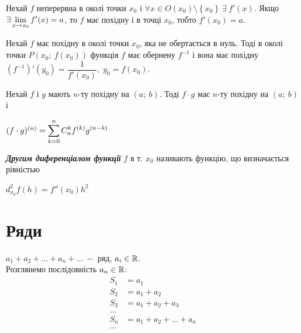 \begin{theorem}
        Нехай $f$ неперервна в околі точки $x_0$ і  $\forall x \in O(x_0)\setminus \left \{ x_0  \right \} \ \exists \ f'(x)$. Якщо $\exists \displaystyle\lim\limits_{x \to x_0} f'(x) = a$, то $f$ має похідну і в точці $x_0$, тобто $f'(x_0) = a$.
\end{theorem}

\begin{theorem}
        Нехай $f$ має похідну в околі точки $x_0$, яка не обертається в нуль. Тоді в околі точки $P(x_0; \:  f(x_0))$ функція $f$ має обернену $f^{-1}$ і вона має похідну $(f^{-1})'(y_0) = \dfrac{1}{f'(x_0)}, \; y_0 = f(x_0)$.
\end{theorem}

\begin{theorem}
        Нехай $f$ і $g$ мають $n$-ту похідну на $(a; \: b)$. Тоді $f\cdot g$ має $n$-ту похідну на $(a; \: b)$ і  \centerline{$(f \cdot g)^{(n)} = \displaystyle\sum\limits_{k=0}^n C_n^{k}  f^{(k)}  g^{(n - k)}$}
\end{theorem}

\begin{definition}
        \textcolor{NavyBlue}{\textbf{\textit{ Другим диференціалом функції}}} $f$ в т. $x_0$ називають функцію, що визначається рівністью \centerline{$d^{2}_{x_0}f(h) = f''(x_0)  h^{2}$}
\end{definition}

\newpage
    



\newpage
\section{\Large{Ряди}}
$a_1 + a_2 + \ldots + a_n + \ldots \: -$ ряд, $a_i \in \mathbb{R}$. \\

Розглянемо послідовність $a_n \in \mathbb{R}$:
\begin{equation} 
    \label{ep:1.1}
    \begin{aligned}
        S_1 &= a_1\\
        S_2 &= a_1 + a_2\\
        S_3 &= a_1 + a_2 + a_3 \\
        \ldots \\
        S_n &= a_1 + a_2 + \ldots + a_n \\
        \ldots
    \end{aligned}
\end{equation}

